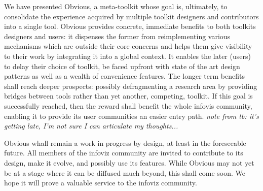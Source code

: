 
We have presented Obvious, a meta-toolkit whose goal is, ultimately, to consolidate the experience acquired by multiple toolkit designers and contributors into a single tool. Obvious provides concrete, immediate benefits to both toolkits designers and users: it dispenses the former from reimplementing various mechanisms which are outside their core concerns and helps them give visibility to their work by integrating it into a global context. It enables the later (users) to delay their choice of toolkit, be faced upfront with state of the art design patterns as well as a wealth of convenience features. The longer term benefits shall reach deeper prospects: possibly defragmenting a research area by providing bridges between tools rather than yet another, competing, toolkit. If this goal is successfully reached, then the reward shall benefit the whole infovis community, enabling it to provide its user communities an easier entry path. \emph{note from tb: it's getting late, I'm not sure I can articulate my thoughts...}

Obvious whall remain a work in progress by design, at least in the foreseeable future. All members of the infoviz community are invited to contribute to its design, make it evolve, and possibly use its features. While Obvious may not yet be at a stage where it can be diffused much beyond, this shall come soon. We hope it will prove a valuable service to the infoviz community. 
